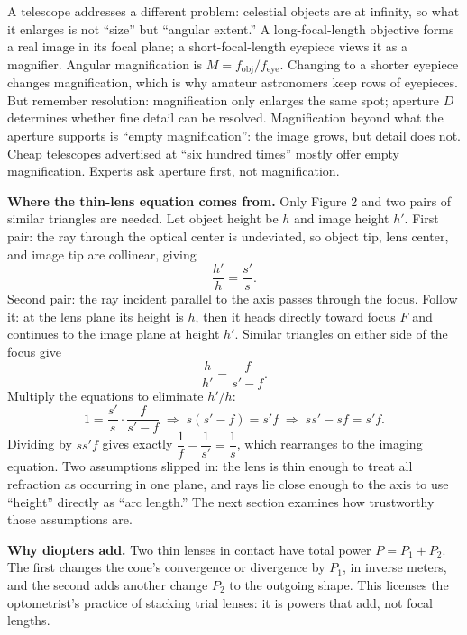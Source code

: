 \begin{mainline}
A telescope addresses a different problem: celestial objects are at infinity, so what it enlarges is not ``size'' but ``angular extent.'' A long-focal-length objective forms a real image in its focal plane; a short-focal-length eyepiece views it as a magnifier. Angular magnification is $M=f_{\text{obj}}/f_{\text{eye}}$. Changing to a shorter eyepiece changes magnification, which is why amateur astronomers keep rows of eyepieces. But remember resolution: magnification only enlarges the same spot; aperture $D$ determines whether fine detail can be resolved. Magnification beyond what the aperture supports is ``empty magnification'': the image grows, but detail does not. Cheap telescopes advertised at ``six hundred times'' mostly offer empty magnification. Experts ask aperture first, not magnification.

\end{mainline}

\begin{mathbridge}
\textbf{Where the thin-lens equation comes from.} Only Figure 2 and two pairs of similar triangles are needed. Let object height be $h$ and image height $h'$. First pair: the ray through the optical center is undeviated, so object tip, lens center, and image tip are collinear, giving
\[
\frac{h'}{h}=\frac{s'}{s}.
\]
Second pair: the ray incident parallel to the axis passes through the focus. Follow it: at the lens plane its height is $h$, then it heads directly toward focus $F$ and continues to the image plane at height $h'$. Similar triangles on either side of the focus give
\[
\frac{h}{h'}=\frac{f}{s'-f}.
\]
Multiply the equations to eliminate $h'/h$:
\[
1=\frac{s'}{s}\cdot\frac{f}{s'-f}
\;\Longrightarrow\;
s(s'-f)=s'f
\;\Longrightarrow\;
ss'-sf=s'f.
\]
Dividing by $ss'f$ gives exactly $\dfrac{1}{f}-\dfrac{1}{s'}=\dfrac{1}{s}$, which rearranges to the imaging equation. Two assumptions slipped in: the lens is thin enough to treat all refraction as occurring in one plane, and rays lie close enough to the axis to use ``height'' directly as ``arc length.'' The next section examines how trustworthy those assumptions are.

\textbf{Why diopters add.} Two thin lenses in contact have total power $P=P_1+P_2$. The first changes the cone's convergence or divergence by $P_1$, in inverse meters, and the second adds another change $P_2$ to the outgoing shape. This licenses the optometrist's practice of stacking trial lenses: it is powers that add, not focal lengths.
\end{mathbridge}


